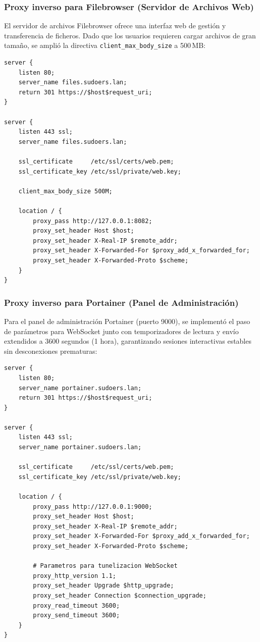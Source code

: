 \subsubsection{Proxy inverso para Filebrowser (Servidor de Archivos Web)}

El servidor de archivos Filebrowser ofrece una interfaz web de gestión y
transferencia de ficheros. Dado que los usuarios requieren cargar archivos de gran
tamaño, se amplió la directiva \texttt{client\_max\_body\_size} a 500\,MB:

\begin{lstlisting}[style=terminal]
server {
    listen 80;
    server_name files.sudoers.lan;
    return 301 https://$host$request_uri;
}

server {
    listen 443 ssl;
    server_name files.sudoers.lan;

    ssl_certificate     /etc/ssl/certs/web.pem;
    ssl_certificate_key /etc/ssl/private/web.key;

    client_max_body_size 500M;

    location / {
        proxy_pass http://127.0.0.1:8082;
        proxy_set_header Host $host;
        proxy_set_header X-Real-IP $remote_addr;
        proxy_set_header X-Forwarded-For $proxy_add_x_forwarded_for;
        proxy_set_header X-Forwarded-Proto $scheme;
    }
}
\end{lstlisting}

\subsubsection{Proxy inverso para Portainer (Panel de Administración)}

Para el panel de administración Portainer (puerto 9000), se implementó el paso
de parámetros para WebSocket junto con temporizadores de lectura y envío
extendidos a 3600 segundos (1 hora), garantizando sesiones interactivas estables
sin desconexiones prematuras:

\begin{lstlisting}[style=terminal]
server {
    listen 80;
    server_name portainer.sudoers.lan;
    return 301 https://$host$request_uri;
}

server {
    listen 443 ssl;
    server_name portainer.sudoers.lan;

    ssl_certificate     /etc/ssl/certs/web.pem;
    ssl_certificate_key /etc/ssl/private/web.key;

    location / {
        proxy_pass http://127.0.0.1:9000;
        proxy_set_header Host $host;
        proxy_set_header X-Real-IP $remote_addr;
        proxy_set_header X-Forwarded-For $proxy_add_x_forwarded_for;
        proxy_set_header X-Forwarded-Proto $scheme;

        # Parametros para tunelizacion WebSocket
        proxy_http_version 1.1;
        proxy_set_header Upgrade $http_upgrade;
        proxy_set_header Connection $connection_upgrade;
        proxy_read_timeout 3600;
        proxy_send_timeout 3600;
    }
}
\end{lstlisting}

